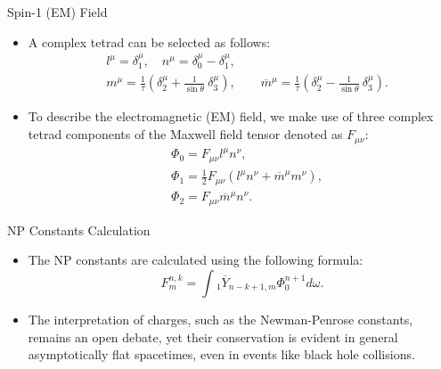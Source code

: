 \documentclass{beamer}
\theoremstyle{remark}
\theoremstyle{plain}
\theoremstyle{plain}
\begin{document}
\begin{frame}{Spin-1 (EM) Field}
  \begin{itemize}
    \item A complex tetrad can be selected as follows:
      \begin{align}\label{eq:tetrad}
        & l^{\mu} = \delta_{1}^{\mu}, \quad n^{\mu} = \delta_{0}^{\mu} - \delta_{1}^{\mu}, \nonumber \\
        & m^{\mu} = \displaystyle\frac{1}{\tau}\left(\delta_{2}^{\mu} + \displaystyle\frac{1}{\sin\theta}\ \delta_{3}^{\mu}\right), \qquad \overline{m}^{\mu} = \displaystyle\frac{1}{\tau}\left(\delta_{2}^{\mu} - \displaystyle\frac{1}{\sin\theta}\ \delta_{3}^{\mu}\right).
      \end{align}
    \item To describe the electromagnetic (EM) field, we make use of three complex tetrad components of the Maxwell field tensor denoted as $F_{\mu \nu}$:
      \begin{align}\label{eq:Maxtensor}
        & \Phi_{0} = F_{\mu \nu}l^{\mu}n^{\nu}, \nonumber \\
        & \Phi_{1} = \frac{1}{2} F_{\mu \nu}(l^{\mu}n^{\nu} + \overline{m}^{\mu}m^{\nu}), \nonumber \\
        & \Phi_{2} = F_{\mu \nu}\overline{m}^{\mu}n^{\nu}.
      \end{align}
  \end{itemize}
\end{frame}

\begin{frame}{NP Constants Calculation}
  \begin{itemize}
    \item The NP constants are calculated using the following formula:
    \begin{equation}
      F_{m}^{n,k} = \int{_{1}\overline{Y}_{n-k+1,m}\Phi_{0}^{n+1} d\omega}.
    \end{equation}
    \item The interpretation of charges, such as the Newman-Penrose constants, remains an open debate, yet their conservation is evident in general asymptotically flat spacetimes, even in events like black hole collisions.
  \end{itemize}
\end{frame}
\end{document}
